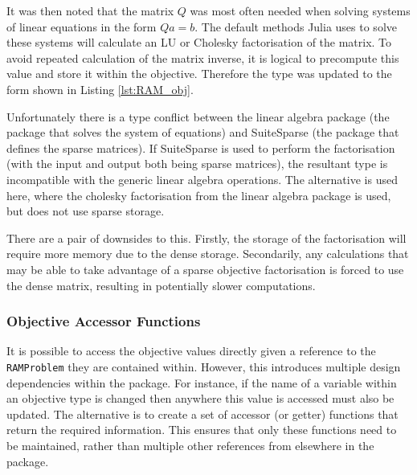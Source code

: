 

It was then noted that the matrix $Q$ was most often needed when solving systems of linear equations in the form $Qa=b$. The default methods Julia uses to solve these systems will calculate an LU or Cholesky factorisation of the matrix. To avoid repeated calculation of the matrix inverse, it is logical to precompute this value and store it within the objective. Therefore the type was updated to the form shown in Listing \ref{lst:RAM_obj}.



Unfortunately there is a type conflict between the linear algebra package (the package that solves the system of equations) and SuiteSparse (the package that defines the sparse matrices). If SuiteSparse is used to perform the factorisation (with the input and output both being sparse matrices), the resultant type is incompatible with the generic linear algebra operations. The alternative is used here, where the cholesky factorisation from the linear algebra package is used, but does not use sparse storage. 

There are a pair of downsides to this. Firstly, the storage of the factorisation will require more memory due to the dense storage. Secondarily, any calculations that may be able to take advantage of a sparse objective factorisation is forced to use the dense matrix, resulting in potentially slower computations.

\subsubsection{Objective Accessor Functions}
It is possible to access the objective values directly given a reference to the \texttt{RAMProblem} they are contained within. However, this introduces multiple design dependencies within the package. For instance, if the name of a variable within an objective type is changed then anywhere this value is accessed must also be updated. The alternative is to create a set of accessor (or getter) functions that return the required information. This ensures that only these functions need to be maintained, rather than multiple other references from elsewhere in the package.

